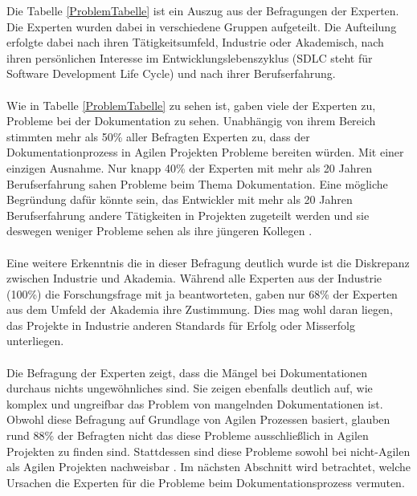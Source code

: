 \documentclass[a4paper,12pt]{scrartcl}
\begin{document}
Die Tabelle \ref{ProblemTabelle} ist ein Auszug aus der Befragungen der Experten. Die Experten wurden dabei in verschiedene Gruppen aufgeteilt. Die Aufteilung erfolgte dabei nach ihren Tätigkeitsumfeld, Industrie oder Akademisch, nach ihren persönlichen Interesse im Entwicklungslebenszyklus (SDLC steht für Software Development Life Cycle) und nach ihrer Berufserfahrung.
\\\\
Wie in Tabelle \ref{ProblemTabelle} zu sehen ist, gaben viele der Experten zu, Probleme bei der Dokumentation zu sehen. Unabhängig von ihrem Bereich stimmten mehr als 50\% aller Befragten Experten zu, dass der Dokumentationprozess in Agilen Projekten Probleme bereiten würden. Mit einer einzigen Ausnahme. Nur knapp 40\% der Experten mit mehr als 20 Jahren Berufserfahrung sahen Probleme beim Thema Dokumentation. Eine mögliche Begründung dafür könnte sein, das Entwickler mit mehr als 20 Jahren Berufserfahrung andere Tätigkeiten in Projekten zugeteilt werden und sie deswegen weniger Probleme sehen als ihre jüngeren Kollegen \cite{Prause2012}.
\\\\
Eine weitere Erkenntnis die in dieser Befragung deutlich wurde ist die Diskrepanz zwischen Industrie und Akademia. Während alle Experten aus der Industrie (100\%) die Forschungsfrage mit ja beantworteten, gaben nur 68\% der Experten aus dem Umfeld der Akademia ihre Zustimmung. Dies mag wohl daran liegen, das Projekte in Industrie anderen Standards für Erfolg oder Misserfolg unterliegen.
\\\\
Die Befragung der Experten zeigt, dass die Mängel bei Dokumentationen durchaus nichts ungewöhnliches sind. Sie zeigen ebenfalls deutlich auf, wie komplex und ungreifbar das Problem von mangelnden Dokumentationen ist. Obwohl diese Befragung auf Grundlage von Agilen Prozessen basiert, glauben rund 88\% der Befragten nicht das diese Probleme ausschließlich in Agilen Projekten zu finden sind. Stattdessen sind diese Probleme sowohl bei nicht-Agilen als Agilen Projekten nachweisbar \cite{Prause2012}. Im nächsten Abschnitt wird betrachtet, welche Ursachen die Experten für die Probleme beim Dokumentationsprozess vermuten.
\end{document}
